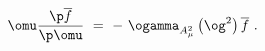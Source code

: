 \begin{equation}\label{25}
\omu\frac{\p \overline{f}}{\p \omu} ~=~ -~
\ogamma_{A_\mu^{2}}\left(\og^{2} \right) \overline{f} ~.
\end{equation}

